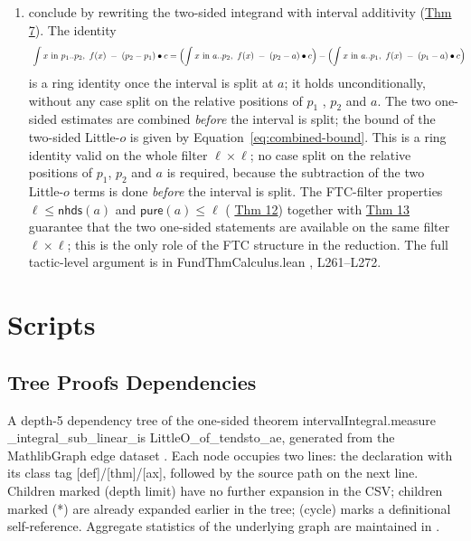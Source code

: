 \documentclass[11pt,reqno]{amsart}
\begin{document}
\begin{enumerate}
\item conclude by rewriting the two-sided integrand with interval additivity
(\hyperlink{thm:addadj}{Thm 7}). The identity 
\begin{equation}
\resizebox{\textwidth}{!}{ $\displaystyle \int x\ \text{in}\ p_{1}..p_{2},\
f(x)\;-\;(p_{2}-p_{1})\bullet c = \Bigl(\int x\ \text{in}\ a..p_{2},\
f(x)\;-\;(p_{2}-a)\bullet c\Bigr) - \Bigl(\int x\ \text{in}\ a..p_{1},\
f(x)\;-\;(p_{1}-a)\bullet c\Bigr) $}
\end{equation}
is a ring identity once the interval is split at $a$; it holds
unconditionally, without any case split on the relative positions of $p_{1}$%
, $p_{2}$ and $a$. The two one-sided estimates are combined \emph{before}
the interval is split; the bound of the two-sided Little-$o$ is given by
Equation~\eqref{eq:combined-bound}. This is a ring identity valid on the
whole filter $\ell\times\ell$; no case split on the relative positions of $%
p_{1}$, $p_{2}$ and $a$ is required, because the subtraction of the two
Little-$o$ terms is done \emph{before} the interval is split. The FTC-filter
properties $\ell\le\mathsf{nhds}(a)$ and $\mathsf{pure}(a)\le\ell$ (
\hyperlink{thm:purele}{Thm 12}) together with \hyperlink{thm:toIxx}{Thm 13}
guarantee that the two one-sided statements are available on the same filter 
$\ell\times\ell$; this is the only role of the FTC structure in the
reduction. The full tactic-level argument is in \textsf{FundThmCalculus.lean}%
, L261--L272.
\end{enumerate}

\section{Scripts}

\label{sec:scripts}

\subsection{Tree Proofs Dependencies}

\label{sec:tree}

\noindent A depth-5 dependency tree of the one-sided theorem \textsf{%
interval\allowbreak Integral.measure\allowbreak
\_integral\allowbreak\_sub\allowbreak\_linear\allowbreak\_is\allowbreak
LittleO\allowbreak\_of\allowbreak\_tendsto\allowbreak\_ae}, generated from
the MathlibGraph edge dataset \cite{mathlibgraph2026, mathlibgraph,
network-structure-mathlib}. Each node occupies two lines: the declaration
with its class tag \textsf{[def]}/\textsf{[thm]}/\textsf{[ax]}, followed by
the source path on the next line. Children marked \textsf{(depth limit)}
have no further expansion in the CSV; children marked \textsf{(*)} are
already expanded earlier in the tree; \textsf{(cycle)} marks a definitional
self-reference. Aggregate statistics of the underlying graph are maintained
in \cite{mathlib-stats}.
\end{document}
